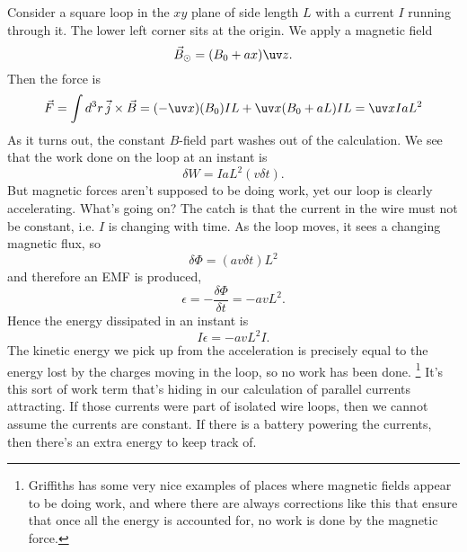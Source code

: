 Consider a square loop in the $xy$ plane of side length $L$ with a current $I$ running through it. The lower left corner sits at the origin. We apply a magnetic field
\begin{equation}
    \vec B_{\odot} = (B_0 + ax) \uv z.
\end{equation}
Then the force is
\begin{equation}
    \vec F =\int d^3r \, \vec j \times \vec B = (-\uv x)(B_0)IL + \uv x(B_0 + aL) IL = \uv x IaL^2
\end{equation}
As it turns out, the constant $B$-field part washes out of the calculation. We see that the work done on the loop at an instant is
\begin{equation}
    \delta W = I a L^2 (v \delta t).
\end{equation}
But magnetic forces aren't supposed to be doing work, yet our loop is clearly accelerating. What's going on? The catch is that the current in the wire must not be constant, i.e. $I$ is changing with time. As the loop moves, it sees a changing magnetic flux, so
\begin{equation}
    \delta \Phi = (av \delta t)L^2
\end{equation}
and therefore an EMF is produced,
\begin{equation}
    \epsilon = -\frac{\delta \Phi}{\delta t} =-avL^2.
\end{equation}
Hence the energy dissipated in an instant is
\begin{equation}
    I\epsilon = - av L^2 I.
\end{equation}
The kinetic energy we pick up from the acceleration is precisely equal to the energy lost by the charges moving in the loop, so no work has been done.%
    \footnote{Griffiths has some very nice examples of places where magnetic fields appear to be doing work, and where there are always corrections like this that ensure that once all the energy is accounted for, no work is done by the magnetic force.}
It's this sort of work term that's hiding in our calculation of parallel currents attracting. If those currents were part of isolated wire loops, then we cannot assume the currents are constant. If there is a battery powering the currents, then there's an extra energy to keep track of.

